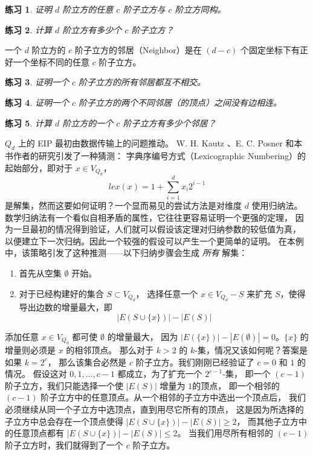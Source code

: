 \documentclass[12pt, a4paper]{article}
\newtheorem{exercise}{练习}
\begin{document}
\begin{exercise}
\label{Exercise 3}
证明 $d$ 阶立方的任意 $c$ 阶子立方与 $c$ 阶立方同构。
\end{exercise}

\begin{exercise}
\label{Exercise 4}
计算 $d$ 阶立方有多少个 $c$ 阶子立方？
\end{exercise}

一个 $d$ 阶立方的 $c$ 阶子立方的邻居（Neighbor）是在 $(d − c)$
个固定坐标下有正好一个坐标不同的任意 $c$ 阶子立方。

\begin{exercise}
\label{Exercise 5}
证明一个 $c$ 阶子立方的所有邻居都互不相交。
\end{exercise}

\begin{exercise}
\label{Exercise 6}
证明一个 $c$ 阶子立方的两个不同邻居（的顶点）之间没有边相连。
\end{exercise}

\begin{exercise}
\label{Exercise 7}
计算 $d$ 阶立方的一个 $c$ 阶子立方有多少个邻居？
\end{exercise}

$Q_d$ 上的 EIP 最初由数据传输上的问题推动。
W. H. Kautz \cite{Kautz.1954}、E. C. Posner 和本书作者的研究引发了一种猜测：
字典序编号方式（Lexicographic Numbering）的起始部分，即对于 $x \in V_{Q_d}$，
\begin{equation*}
lex(x) = 1 + \sum_{i = 1}^d x_i 2^{i - 1}
\end{equation*}
是解集，然而这要如何证明？一个显而易见的尝试方法是对维度 $d$ 使用归纳法。
数学归纳法有一个看似自相矛盾的属性，它往往更容易证明一个更强的定理，
因为一旦最初的情况得到验证，人们就可以假设该定理对归纳参数的较低值为真，
以便建立下一次归纳。因此一个较强的假设可以产生一个更简单的证明。
在本例中，该策略引发了这种推测——以下归纳步骤会生成 \emph{所有} 解集：

\begin{enumerate}[(1)]
	\item 首先从空集 $\emptyset$ 开始。
	\item 对于已经构建好的集合 $S \subset V_{Q_d}$，
		选择任意一个 $x \in V_{Q_d} − S$ 来扩充 $S$，使得导出边数的增量最大，即
		\begin{equation*}
		|E(S \cup \{x\})| − |E(S)|
		\end{equation*}
\end{enumerate}

添加任意 $x \in V_{Q_d}$ 都可使 $\emptyset$ 的增量最大，
因为 $|E(\{x\})| − |E(\emptyset)| = 0$。$\{x\}$ 的增量则必须是 $x$ 的相邻顶点。
那么对于 $k > 2$ 的 $k$-集，情况又该如何呢？答案是如果 $k = 2^c$，
那么该集合必然是 $c$ 阶子立方。我们刚刚已经验证了 $c = 0$ 和 $1$ 的情况。
假设这对 $0, 1, \dots, c − 1$ 都成立，为了扩充一个 $2^{c − 1}$-集，
即一个 $(c − 1)$ 阶子立方，我们只能选择一个使 $|E(S)|$ 增量为 $1 $的顶点，
即一个相邻的 $(c − 1)$ 阶子立方中的任意顶点。从一个相邻的子立方中选出一个顶点后，
我们必须继续从同一个子立方中选顶点，直到用尽它所有的顶点，
这是因为所选择的子立方中总会存在一个顶点使得 $|E(S \cup \{x\})| − |E(S)| \ge 2$，
而其他子立方中的任意顶点都有 $|E(S \cup \{x\})| − |E(S)| \le 2$。
当我们用尽所有相邻的 $(c − 1)$ 阶子立方时，我们就得到了一个 $c$ 阶子立方。
\end{document}
